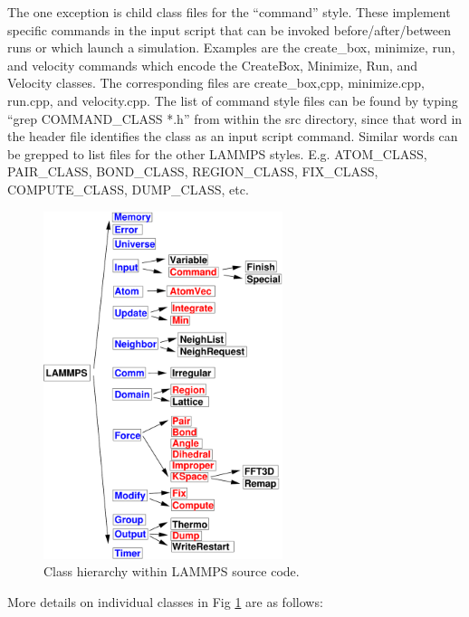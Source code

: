 \documentclass{article}
\begin{document}
The one exception is child class files for the ``command'' style.  These
implement specific commands in the input script that can be invoked
before/after/between runs or which launch a simulation.  Examples are
the create\_box, minimize, run, and velocity commands which encode the
CreateBox, Minimize, Run, and Velocity classes.  The corresponding
files are create\_box,cpp, minimize.cpp, run.cpp, and velocity.cpp.
The list of command style files can be found by typing ``grep
COMMAND\_CLASS *.h'' from within the src directory, since that word in
the header file identifies the class as an input script command.
Similar words can be grepped to list files for the other LAMMPS
styles.  E.g. ATOM\_CLASS, PAIR\_CLASS, BOND\_CLASS, REGION\_CLASS,
FIX\_CLASS, COMPUTE\_CLASS, DUMP\_CLASS, etc.

\begin{figure}[htb]
 \begin{center}
 \includegraphics[height=4in]{classes.pdf}
 \end{center}
 \caption{Class hierarchy within LAMMPS source code.}
\label{fig:classes}
\end{figure}

More details on individual classes in Fig \ref{fig:classes} are as
follows:
\end{document}
